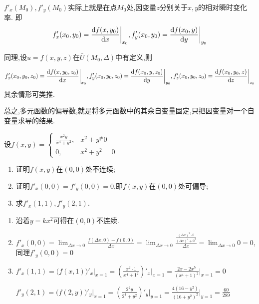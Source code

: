 $f'_x(M_0),f'_y(M_0)$实际上就是在点$M_0$处,因变量$z$分别关于$x,y$的相对瞬时变化率.
即$$f'_x(x_0,y_0)=\frac{\operatorname{d\!}{}f(x,y_0)}{\operatorname{d\!}{}x}\bigg|_{x_0},f'_y(x_0,y_0)=\frac{\operatorname{d\!}{}f(x_0,y)}{\operatorname{d\!}{}y}\bigg|_{y_0}$$

同理,设$u=f(x,y,z)$在$\bar{U}(M_0,\Delta)$中有定义,则

$$f'_x(x_0,y_0,z_0)=\frac{\operatorname{d\!}{}f(x,y_0,z_0)}{\operatorname{d\!}{}x}\bigg|_{x_0},f'_y(x_0,y_0,z_0)=\frac{\operatorname{d\!}{}f(x_0,y,z_0)}{\operatorname{d\!}{}y}\bigg|_{y_0},f'_z(x_0,y_0,z_0)=\frac{\operatorname{d\!}{}f(x_0,y_0,z)}{\operatorname{d\!}{}z}\bigg|_{z_0}$$其余情形可类推.

总之,多元函数的偏导数,就是将多元函数中的其余自变量固定,只把因变量对一个自变量求导的结果.

\begin{example}
    设$f(x,y)=\begin{cases}
        \frac{x^2y}{x^4+y^2},&x^2+y^\neq0\\
        0,&x^2+y^2=0
    \end{cases}$
    \begin{enumerate}
        \item 证明$f(x,y)$在$(0,0)$处不连续;
        \item 证明$f'_x(0,0)=f'_y(0,0)=0$,即$f(x,y)$在$(0,0)$处可偏导;
        \item 求$f'_x(1,1),f'_y(2,1)$.
    \end{enumerate}
\end{example}
\begin{solution}
    \begin{enumerate}
        \item 沿着$y=kx^2$可得在$(0,0)$不连续.
        \item $f'_x(0,0)=\lim_{\Delta x\to 0}\frac{f(\Delta x,0)-f(0,0)}{\Delta x}=\lim_{\Delta x\to 0}\frac{\frac{(\Delta x)^2\cdot 0}{(\Delta x)^4+0^2}}{\Delta x}=\lim_{\Delta x\to 0}0=0$,同理$f'_y(0,0)=0$
        \item $f'_x(1,1)=\big(f(x,1)\big)'_x\bigg|_{x=1}=\left(\frac{x^2\cdot 1}{x^4+1^2}\right)'_x\bigg|_{x=1}=\frac{2x-2x^5}{(x^4+1)^2}\bigg|_{x=1}=0$
        
        $f'_y(2,1)=\big(f(2,y)\big)'_y\bigg|_{x=1}=\left(\frac{2^2y}{2^4+y^2}\right)'_y\bigg|_{y=1}=\frac{4(16-y^2)}{(16+y^2)^2}\bigg|_{y=1}=\frac{60}{289}$
    \end{enumerate}
\end{solution}

